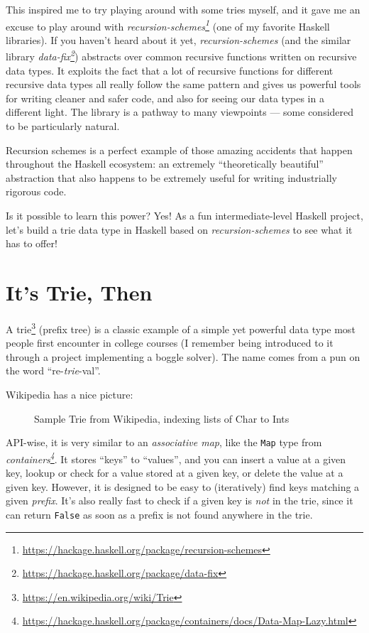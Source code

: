 \documentclass[]{article}
\renewcommand{\href}[2]{#2\footnote{\url{#1}}}
\begin{document}
This inspired me to try playing around with some tries myself, and it gave me an
excuse to play around with
\emph{\href{https://hackage.haskell.org/package/recursion-schemes}{recursion-schemes}}
(one of my favorite Haskell libraries). If you haven't heard about it yet,
\emph{recursion-schemes} (and the similar library
\emph{\href{https://hackage.haskell.org/package/data-fix}{data-fix}}) abstracts
over common recursive functions written on recursive data types. It exploits the
fact that a lot of recursive functions for different recursive data types all
really follow the same pattern and gives us powerful tools for writing cleaner
and safer code, and also for seeing our data types in a different light. The
library is a pathway to many viewpoints --- some considered to be particularly
natural.

Recursion schemes is a perfect example of those amazing accidents that happen
throughout the Haskell ecosystem: an extremely ``theoretically beautiful''
abstraction that also happens to be extremely useful for writing industrially
rigorous code.

Is it possible to learn this power? Yes! As a fun intermediate-level Haskell
project, let's build a trie data type in Haskell based on
\emph{recursion-schemes} to see what it has to offer!

\section{It's Trie, Then}\label{its-trie-then}

A \href{https://en.wikipedia.org/wiki/Trie}{trie} (prefix tree) is a classic
example of a simple yet powerful data type most people first encounter in
college courses (I remember being introduced to it through a project
implementing a boggle solver). The name comes from a pun on the word
``re-\emph{trie}-val''.

Wikipedia has a nice picture:

\begin{figure}
\centering
{}
\caption{Sample Trie from Wikipedia, indexing lists of Char to Ints}
\end{figure}

API-wise, it is very similar to an \emph{associative map}, like the \texttt{Map}
type from
\emph{\href{https://hackage.haskell.org/package/containers/docs/Data-Map-Lazy.html}{containers}}.
It stores ``keys'' to ``values'', and you can insert a value at a given key,
lookup or check for a value stored at a given key, or delete the value at a
given key. However, it is designed to be easy to (iteratively) find keys
matching a given \emph{prefix}. It's also really fast to check if a given key is
\emph{not} in the trie, since it can return \texttt{False} as soon as a prefix
is not found anywhere in the trie.
\end{document}
